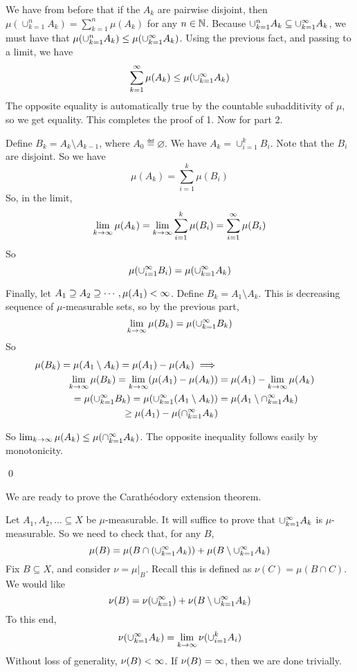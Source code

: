 \documentclass[x11names,reqno,14pt]{extarticle}
\newcommand{\seq}[2][\oo]{_{#2 = 1}^#1}
\begin{document}
\proof

We have from before that if the $A_k$ are pairwise disjoint, then $\mu(\cup_{k=1}^nA_k) = \sum_{k=1}^n\mu(A_k)$ for any $n \in \mathbb{N}$. Because $\cup_{k=1}^nA_k \subseteq \cup\seq{k}A_k$, we must have that $\mu(\cup_{k=1}^nA_k) \leq \mu(\cup\seq{k}A_k)$. Using the previous fact, and passing to a limit, we have
\[
\sum\seq{k}\mu(A_k) \leq \mu(\cup\seq{k}A_k)
\]
The opposite equality is automatically true by the countable subadditivity of $\mu$, so we get equality. This completes the proof of 1. Now for part 2. 

Define $B_k = A_k \setminus A_{k - 1}$, where $A_0 \eqdef \varnothing$. We have $A_k = \cup_{i=1}^kB_i$. Note that the $B_i$ are disjoint. So we have
\[
\mu(A_k) = \sum_{i=1}^k\mu(B_i)
\]
So, in the limit, 
\[
\lim_{k\to\oo}\mu(A_k) = \lim_{k\to\oo}\sum_{i=1}^k\mu(B_i) = \sum\seq{i}\mu(B_i)
\]
So
\[
\mu(\cup\seq{i}B_i) = \mu(\cup\seq{k}A_k)
\]

Finally, let $A_1 \supseteq A_2 \supseteq \cdots, \mu(A_1)<\infty$. Define $B_k = A_1\setminus A_k$. This is decreasing sequence of $\mu$-measurable sets, so by the previous part, 
\[
\lim_{k\to\oo}\mu(B_k) = \mu(\cup\seq{k}B_k)
\]
So
\begin{align*}
\mu(B_k) = \mu(A_1\setminus A_k)  = \mu(A_1) - \mu(A_k) \implies \\
\lim_{k\to\oo}\mu(B_k) = \lim_{k\to\oo}(\mu(A_1) - \mu(A_k)) & = \mu(A_1) - \lim_{k\to\oo}\mu(A_k) \\
= \mu(\cup\seq{k}B_k) = \mu(\cup\seq{k}(A_1 \setminus A_k)) & = \mu(A_1 \setminus \cap\seq{k} A_k) \\
\geq \mu(A_1) - \mu(\cap\seq{k}A_k) & \\
\end{align*}

So $\lim_{k\to\oo}\mu(A_k) \leq \mu(\cap\seq{k}A_k)$. The opposite inequality follows easily by monotonicity. 

\qed

We are ready to prove the Carath\'eodory extension theorem. 

\proof

Let $A_1, A_2, \dots \subseteq X$ be $\mu$-measurable. It will suffice to prove that $\cup\seq{k}A_k$ is $\mu$-measurable. So we need to check that, for any $B$, 
\[
\mu(B) = \mu(B\cap (\cup\seq{k}A_k)) + \mu(B \setminus \cup\seq{k}A_k)
\]
Fix $B \subseteq X$, and consider $\nu = \mu|_B$. Recall this is defined as $\nu(C) = \mu(B \cap C)$. We would like 
\[
\nu(B) = \nu(\cup\seq{k}) + \nu(B \setminus \cup\seq{k}A_k)
\]
To this end, 
\begin{align*}
\nu(\cup\seq{k}A_k) & = \lim_{k\to\oo}\nu(\cup_{i=1}^kA_i) \\
\end{align*}
Without loss of generality, $\nu(B)<\infty$. If $\nu(B) = \infty$, then we are done trivially. 
\end{document}
